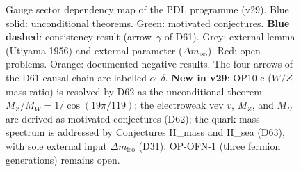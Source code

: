 \documentclass[11pt,a4paper]{article}
\theoremstyle{plain}
\theoremstyle{definition}
\theoremstyle{remark}
\begin{document}
\begin{figure}[H]
{%
}
\caption{Gauge sector dependency map of the PDL programme (v29). \textcolor{proofblue}{Blue solid}: unconditional theorems. \textcolor{conjecturegreen}{Green}: motivated conjectures. \textbf{Blue dashed}: consistency result (arrow~$\gamma$ of D61). Grey: external lemma (Utiyama 1956) and external parameter ($\Delta m_{\mathrm{iso}}$). \textcolor{openproblemred}{Red}: open problems. Orange: documented negative results. The four arrows of the D61 causal chain are labelled $\alpha$--$\delta$. \textbf{New in v29}: OP10-c ($W/Z$ mass ratio) is resolved by D62 as the unconditional theorem $M_Z/M_W = 1/\cos(19\pi/119)$; the electroweak vev $v$, $M_Z$, and $M_H$ are derived as motivated conjectures (D62); the quark mass spectrum is addressed by Conjectures H\_mass and H\_sea (D63), with sole external input $\Delta m_{\mathrm{iso}}$ (D31). OP-OFN-1 (three fermion generations) remains open.}
\label{fig:dependency_gauge}
\end{figure}

\clearpage
\end{document}
